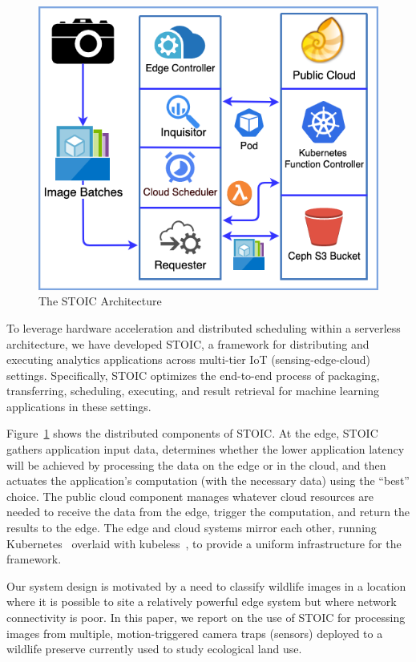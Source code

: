 \begin{figure}
    \centering
    \includegraphics[scale=0.5]{figures/STOIC.png}
    \caption{The STOIC Architecture \label{fig:STOIC}}
\end{figure}


To leverage hardware acceleration and distributed scheduling within a serverless architecture, we have developed STOIC, a framework for distributing and executing analytics applications across multi-tier IoT (sensing-edge-cloud) settings. Specifically, STO\-IC optimizes the end-to-end process of packaging, transferring, scheduling, executing, and result retrieval for machine learning applications in these settings.  

Figure~\ref{fig:STOIC} shows the distributed components of STOIC. At the edge, STOIC gathers application input data, determines whether the lower application latency will be achieved by processing the data on the edge or in the cloud, and then actuates the application's computation (with the necessary data) using the ``best'' choice. The public cloud component manages whatever cloud resources are needed to receive the data from the edge, trigger the computation, and return the results to the edge.  The edge and cloud systems mirror each other, running Kubernetes~\cite{ref:k8s-web,ref:k8s} overlaid with kubeless~\cite{ref:kubeless}, to provide a uniform infrastructure for the framework.

Our system design is motivated by a need to classify wildlife images in a location where it is possible to site a relatively powerful edge system but where network connectivity is poor.  In this paper, we report on the use of STOIC  for processing images from multiple, motion-triggered camera traps (sensors) deployed to a wildlife preserve currently used to study ecological land use.

